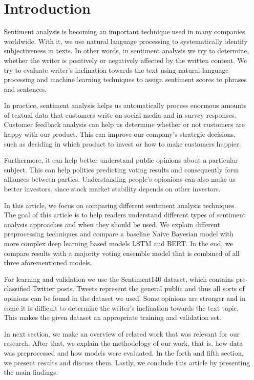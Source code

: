 \documentclass[conference]{IEEEtran}
\begin{document}
\section{Introduction}
Sentiment analysis is becoming an important technique used in many companies worldwide. With it, we use natural language processing to systematically identify subjectiveness in texts. In other words, in sentiment analysis we try to determine, whether the writer is positively or negatively affected by the written content. 
We try to evaluate writer's inclination towards the text using natural language processing and machine learning techniques to assign sentiment scores to phrases and sentences.  

In practice, sentiment analysis helps us automatically process enormous amounts of textual data that customers write on social media and in survey responses. Customer feedback analysis can help us determine whether or not customers are happy with our product. This can improve our company's strategic decisions, such as deciding in which product to invest or how to make customers happier.

Furthermore, it can help better understand public opinions about a particular subject. This can help politics predicting voting results and consequently form alliances between parties. Understanding people's opionions can also make us better investors, since stock market stability depends on other investors.

In this article, we focus on comparing different sentiment analysis techniques. The goal of this article is to help readers understand different types of sentiment analysis approaches and when they should be used. We explain different preprocessing techniques and compare a baseline Naive Bayesian model with more complex deep learning based models LSTM and BERT. In the end, we compare results with a majority voting ensemble model that is combined of all three aforementioned models. 

For learning and validation we use the Sentiment140 dataset, which contains pre-classified Twitter posts. Tweets represent the general public and thus all sorts of opinions can be found in the dataset we used. Some opinions are stronger and in some it is difficult to determine the writer's inclination towards the text topic. This makes the given dataset an appropriate training and validation set.

In next section, we make an overview of related work that was relevant for our research. After that, we explain the methodology of our work, that is, how data was preprocessed and how models were evaluated. In the forth and fifth section, we present results and discuss them. Lastly, we conclude this article by presenting the main findings.
\end{document}
